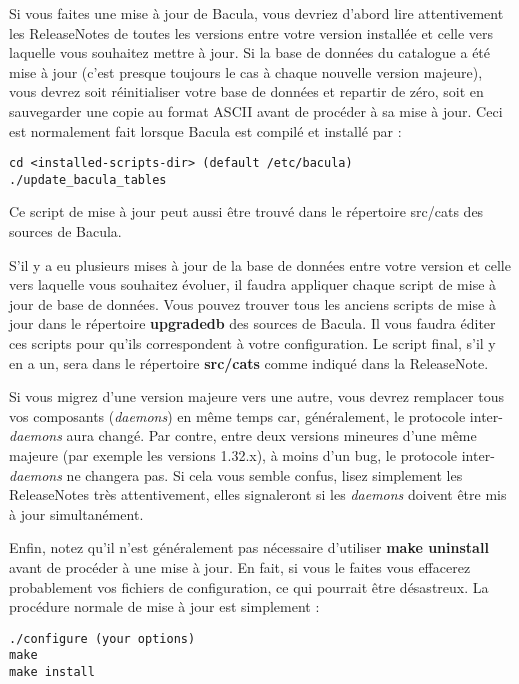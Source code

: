 Si vous faites une mise \`a jour de Bacula, vous devriez d'abord lire
attentivement les ReleaseNotes de toutes les versions entre votre version
install\'ee et celle vers laquelle vous souhaitez mettre \`a jour. Si la base
de donn\'ees du catalogue a \'et\'e mise \`a jour (c'est presque toujours le cas 
à chaque nouvelle version majeure), vous devrez soit
r\'einitialiser votre base de donn\'ees et repartir de z\'ero, soit en
sauvegarder une copie au format ASCII avant de proc\'eder \`a sa mise \`a
jour. Ceci est normalement fait lorsque Bacula est compil\'e et install\'e par :

\begin{verbatim}
cd <installed-scripts-dir> (default /etc/bacula)
./update_bacula_tables
\end{verbatim}

Ce script de mise \`a jour peut aussi \^etre trouv\'e dans le r\'epertoire 
src/cats des sources de Bacula.

S'il y a eu plusieurs mises \`a jour de la base de donn\'ees entre votre
version et celle vers laquelle vous souhaitez \'evoluer, il faudra appliquer
chaque script de mise \`a jour de base de donn\'ees. Vous pouvez trouver tous
les anciens scripts de mise \`a jour dans le r\'epertoire {\bf upgradedb} des
sources de Bacula. Il vous faudra \'editer ces scripts pour qu'ils
correspondent \`a votre configuration. Le script final, s'il y en a un, sera
dans le r\'epertoire {\bf src/cats} comme indiqu\'e dans la ReleaseNote. 

Si vous migrez d'une version majeure vers une autre, vous devrez remplacer
tous vos composants ({\it daemons}) en m\^eme temps car, g\'en\'eralement, le
protocole inter-{\it daemons} aura chang\'e. Par contre, entre deux versions
mineures d'une m\^eme majeure (par exemple les versions 1.32.x), \`a moins
d'un bug, le protocole inter-{\it daemons} ne changera pas. Si cela vous
semble confus, lisez simplement les ReleaseNotes tr\`es attentivement, elles
signaleront si les {\it daemons} doivent \^etre mis \`a jour simultan\'ement. 

Enfin, notez qu'il n'est g\'en\'eralement pas n\'ecessaire d'utiliser 
{\bf make uninstall} avant de proc\'eder \`a une mise \`a jour. En fait, si vous le 
faites vous effacerez probablement vos fichiers de configuration, ce qui 
pourrait \^etre d\'esastreux. La proc\'edure normale de mise \`a jour est simplement : 
\begin{verbatim}
./configure (your options)
make
make install
\end{verbatim}

